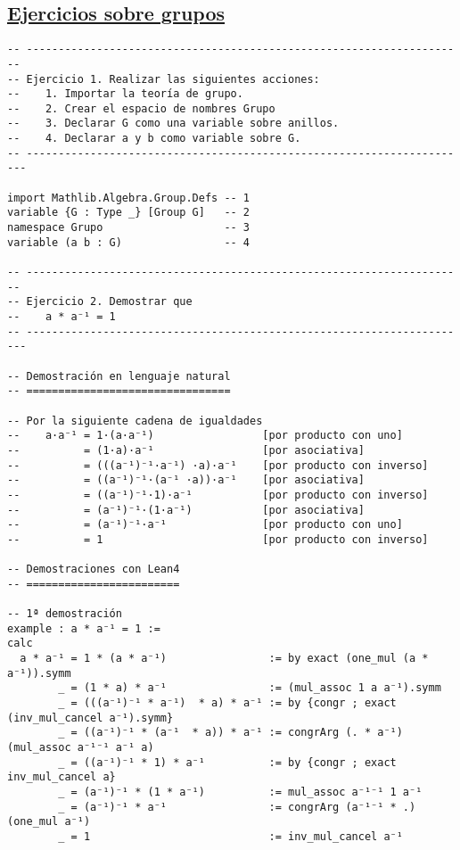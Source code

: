 \subsection{\href{./src/Basicos/Ejercicios\_sobre\_grupos.lean}{Ejercicios sobre grupos}}
\label{sec:org6542f6a}
\begin{verbatim}
-- ---------------------------------------------------------------------
-- Ejercicio 1. Realizar las siguientes acciones:
--    1. Importar la teoría de grupo.
--    2. Crear el espacio de nombres Grupo
--    3. Declarar G como una variable sobre anillos.
--    4. Declarar a y b como variable sobre G.
-- ----------------------------------------------------------------------

import Mathlib.Algebra.Group.Defs -- 1
variable {G : Type _} [Group G]   -- 2
namespace Grupo                   -- 3
variable (a b : G)                -- 4

-- ---------------------------------------------------------------------
-- Ejercicio 2. Demostrar que
--    a * a⁻¹ = 1
-- ----------------------------------------------------------------------

-- Demostración en lenguaje natural
-- ================================

-- Por la siguiente cadena de igualdades
--    a·a⁻¹ = 1·(a·a⁻¹)                 [por producto con uno]
--          = (1·a)·a⁻¹                 [por asociativa]
--          = (((a⁻¹)⁻¹·a⁻¹) ·a)·a⁻¹    [por producto con inverso]
--          = ((a⁻¹)⁻¹·(a⁻¹ ·a))·a⁻¹    [por asociativa]
--          = ((a⁻¹)⁻¹·1)·a⁻¹           [por producto con inverso]
--          = (a⁻¹)⁻¹·(1·a⁻¹)           [por asociativa]
--          = (a⁻¹)⁻¹·a⁻¹               [por producto con uno]
--          = 1                         [por producto con inverso]

-- Demostraciones con Lean4
-- ========================

-- 1ª demostración
example : a * a⁻¹ = 1 :=
calc
  a * a⁻¹ = 1 * (a * a⁻¹)                := by exact (one_mul (a * a⁻¹)).symm
        _ = (1 * a) * a⁻¹                := (mul_assoc 1 a a⁻¹).symm
        _ = (((a⁻¹)⁻¹ * a⁻¹)  * a) * a⁻¹ := by {congr ; exact (inv_mul_cancel a⁻¹).symm}
        _ = ((a⁻¹)⁻¹ * (a⁻¹  * a)) * a⁻¹ := congrArg (. * a⁻¹) (mul_assoc a⁻¹⁻¹ a⁻¹ a)
        _ = ((a⁻¹)⁻¹ * 1) * a⁻¹          := by {congr ; exact inv_mul_cancel a}
        _ = (a⁻¹)⁻¹ * (1 * a⁻¹)          := mul_assoc a⁻¹⁻¹ 1 a⁻¹
        _ = (a⁻¹)⁻¹ * a⁻¹                := congrArg (a⁻¹⁻¹ * .) (one_mul a⁻¹)
        _ = 1                            := inv_mul_cancel a⁻¹


\end{verbatim}
